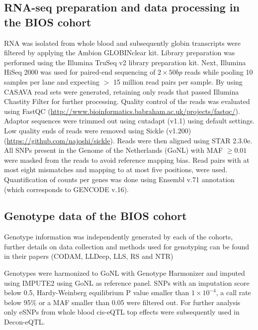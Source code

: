 \subsection{RNA-seq preparation and data processing in the BIOS cohort}
RNA was isolated from whole blood and subsequently globin transcripts were filtered by applying the Ambion GLOBINclear kit. Library preparation was performed using the Illumina TruSeq v2 library preparation kit. Next, Illumina HiSeq 2000 was used for paired-end sequencing of $2 \times 50 bp$ reads while pooling 10 samples per lane and expecting $>$ 15 million read pairs per sample. By using CASAVA read sets were generated, retaining only reads that passed Illumina Chastity Filter for further processing.
Quality control of the reads was evaluated using FastQC (\url{http://www.bioinformatics.babraham.ac.uk/projects/fastqc/}). Adaptor sequences were trimmed out using cutadapt (v1.1) using default settings. Low quality ends of reads were removed using Sickle (v1.200) (\url{https://github.com/najoshi/sickle}). 
Reads were then aligned using STAR 2.3.0e\cite{dobinSTARUltrafastUniversal2013}. All SNPs present in the Genome of the Netherlands (GoNL) with MAF $\geq 0.01$ were masked from the reads to avoid reference mapping bias. Read pairs with at most eight mismatches and mapping to at most five positions, were used. Quantification of counts per genes was done using Ensembl v.71 annotation (which corresponds to GENCODE v.16).

\subsection{Genotype data of the BIOS cohort}
Genotype information was independently generated by each of the cohorts, further details on data collection and methods used for genotyping can be found in their papers (CODAM\cite{damParentalHistoryDiabetes2001}, LLDeep\cite{tigchelaarCohortProfileLifeLines2015}, LLS\cite{deelenGenomewideAssociationMetaanalysis2014}, RS\cite{hofmanRotterdamStudy20162015} and NTR\cite{willemsenNetherlandsTwinRegister2010})

Genotypes were harmonized to GoNL with Genotype Harmonizer\cite{deelenGenotypeHarmonizerAutomatic2014}  and imputed using IMPUTE2\cite{howieFlexibleAccurateGenotype2009} using GoNL as reference panel. SNPs with an imputation score below 0.5, Hardy-Weinberg equilibrium P value smaller than $1 \times 10^{-4}$, a call rate below 95\% or a MAF smaller than 0.05 were filtered out. For further analysis only eSNPs from whole blood cis-eQTL top effects were subsequently used in Decon-eQTL. 

